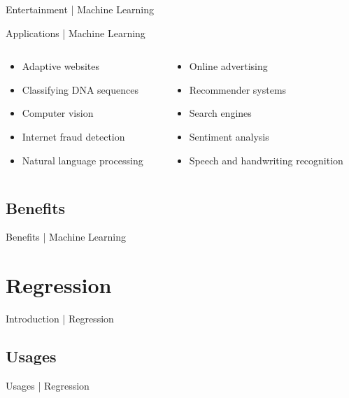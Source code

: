 \documentclass[10pt]{beamer}
\begin{document}
			\begin{frame}{Entertainment | Machine Learning}
			\end{frame}
			\begin{frame}{Applications | Machine Learning}
				\begin{columns}
					\begin{column}{0.5\textwidth}
						\begin{itemize}
							\item Adaptive websites
							\item Classifying DNA sequences
							\item Computer vision
							\item Internet fraud detection
							\item Natural language processing
						\end{itemize}
					\end{column}
					\begin{column}{0.5\textwidth}
						\begin{itemize}
							\item Online advertising
							\item Recommender systems
							\item Search engines
							\item Sentiment analysis
							\item Speech and handwriting recognition
						\end{itemize}
					\end{column}
				\end{columns}	
			\end{frame}
		\subsection{Benefits}
			\begin{frame}{Benefits | Machine Learning}
			\end{frame}
	
	\section{Regression}
		\begin{frame}{Introduction | Regression}
		\end{frame}
		\subsection{Usages}
			\begin{frame}{Usages | Regression}
			\end{frame}
\end{document}

